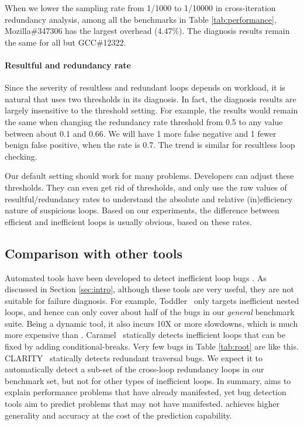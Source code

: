 When we lower the sampling rate from 1/1000 to 1/10000
in cross-iteration redundancy analysis,
among all the benchmarks in Table \ref{tab:performance},
Mozilla\#347306 has the largest overhead (4.47\%). 
The diagnosis results remain 
the same for all but GCC\#12322.

\paragraph{Resultful and redundancy rate}
Since the severity of resultless and redundant loops depends on
workload, it is natural that \Tool uses two thresholds in its diagnosis.
In fact, the diagnosis results are largely insensitive to the threshold
setting. For example, the results would remain the same when
changing the redundancy rate threshold from 0.5 to any value between about
0.1 and 0.66. We will have 1 more false negative and 1 fewer benign false positive, 
when the rate is 0.7. The trend is similar for resultless
loop checking. 

Our default setting %
should work for many problems.
Developers can adjust these thresholds. 
They can even get rid of thresholds, and only
use the raw values of resultful/redundancy rates to understand
the absolute and relative (in)efficiency nature of suspicious 
loops. Based on our experiments, the difference between efficient and inefficient
loops is usually obvious, based on these rates.

\subsection{Comparison with other tools}

Automated tools have been developed to detect inefficient loop bugs
\cite{Alabama, CARAMEL, IsilDillig.PLDI15}. 
As discussed in Section \ref{sec:intro}, although these tools are very
useful, they are not suitable for failure diagnosis. 
For example, Toddler~\cite{Alabama} only targets inefficient nested loops, and
hence can only cover about half of the bugs in our \emph{general} benchmark suite.
Being a dynamic tool, it also incurs 10X or more slowdowns, which is much more
expensive than \Tool. 
Caramel~\cite{CARAMEL} statically detects inefficient loops that can be fixed
by adding conditional-breaks. Very few bugs in Table \ref{tab:root} are like this.
CLARITY~\cite{IsilDillig.PLDI15} statically detects redundant traversal bugs. 
We expect it to automatically detect a sub-set of the cross-loop redundancy
loops in our benchmark set, but not for other types of inefficient
loops. In summary, \Tool aims to explain performance problems that have 
already manifested,
yet bug detection tools aim to predict problems that may not have manifested.
\Tool achieves higher generality and accuracy at the cost of the prediction
capability.

